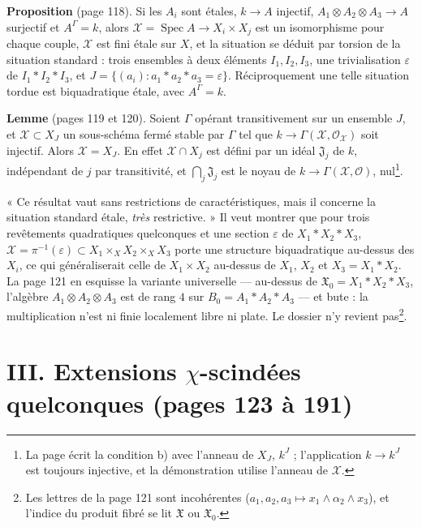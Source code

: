 \documentclass[11pt,a4paper]{article}
\begin{document}
\textbf{Proposition} (page 118). Si les $A_i$ sont étales, $k \to A$ injectif,
$A_1 \otimes A_2 \otimes A_3 \to A$ surjectif et $A^{\Gamma} = k$, alors
$\mathcal{X} = \operatorname{Spec} A \to X_i \times X_j$ est un isomorphisme pour chaque
couple, $\mathcal{X}$ est fini étale sur $X$, et la situation se déduit par torsion
de la situation standard : trois ensembles à deux éléments $I_1, I_2, I_3$, une
trivialisation $\varepsilon$ de $I_1 * I_2 * I_3$, et $J = \{(a_i) : a_1 * a_2 * a_3 =
\varepsilon\}$. Réciproquement une telle situation tordue est biquadratique étale,
avec $A^{\Gamma} = k$.

\textbf{Lemme} (pages 119 et 120). Soient $\Gamma$ opérant transitivement sur un ensemble
$J$, et $\mathcal{X} \subset X_J$ un sous-schéma fermé stable par $\Gamma$ tel que
$k \to \Gamma(\mathcal{X}, \mathcal{O}_{\mathcal{X}})$ soit injectif. Alors $\mathcal{X} =
X_J$. En effet $\mathcal{X} \cap X_j$ est défini par un idéal $\mathfrak{J}_j$ de $k$,
indépendant de $j$ par transitivité, et $\bigcap_j \mathfrak{J}_j$ est le noyau de
$k \to \Gamma(\mathcal{X}, \mathcal{O})$, nul\footnote{La page écrit la condition b)
avec l'anneau de $X_J$, $k^{J}$ ; l'application $k \to k^{J}$ est toujours injective,
et la démonstration utilise l'anneau de $\mathcal{X}$.}.

« Ce résultat vaut sans restrictions de caractéristiques, mais il concerne la
situation standard étale, \emph{très} restrictive. » Il veut montrer que pour trois
revêtements quadratiques quelconques et une section $\varepsilon$ de $X_1 * X_2 * X_3$,
$\mathcal{X} = \pi^{-1}(\varepsilon) \subset X_1 \times_X X_2 \times_X X_3$ porte une structure
biquadratique au-dessus des $X_i$, ce qui généraliserait celle de $X_1 \times X_2$
au-dessus de $X_1$, $X_2$ et $X_3 = X_1 * X_2$. La page 121 en esquisse la variante
universelle --- au-dessus de $\mathfrak{X}_0 = X_1 * X_2 * X_3$, l'algèbre
$A_1 \otimes A_2 \otimes A_3$ est de rang $4$ sur $B_0 = A_1 * A_2 * A_3$ --- et bute :
la multiplication n'est ni finie localement libre ni plate. Le dossier n'y revient
pas\footnote{Les lettres de la page 121 sont incohérentes ($a_1, a_2, a_3 \mapsto x_1
\wedge \alpha_2 \wedge x_3$), et l'indice du produit fibré se lit $\mathfrak{X}$ ou
$\mathfrak{X}_0$.}.

\section*{III. Extensions $\chi$-scindées quelconques (pages 123 à 191)}
\end{document}
